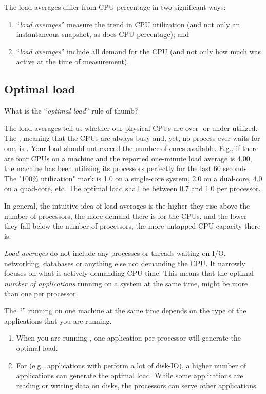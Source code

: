 The load averages differ from CPU percentage in two significant ways:

\begin{enumerate}
\item  ``\emph{load averages}'' measure the trend in CPU utilization (and not only an instantaneous snapshot, as does CPU percentage); and
\item  ``\emph{load averages}'' include all demand for the CPU (and not only how much was active at the time of measurement).
\end{enumerate}

\subsection{Optimal load}

What is the ``\emph{optimal load}'' rule of thumb?

The load averages tell us whether our physical CPUs are over- or
under-utilized. The , meaning that the
CPUs are always busy and, yet, no process ever waits for one, is .  Your load should not exceed the number
of cores available.  E.g., if there are four CPUs on a machine and the reported
one-minute load average is 4.00, the machine has been utilizing its processors
perfectly for the last 60 seconds. The "100\% utilization" mark is 1.0 on a
single-core system, 2.0 on a dual-core, 4.0 on a quad-core, etc. The optimal
load shall be between 0.7 and 1.0 per processor.

In general, the intuitive idea of load averages is the higher they rise above
the number of processors, the more demand there is for the CPUs, and the lower
they fall below the number of processors, the more untapped CPU capacity there
is.

\emph{Load averages} do not include any processes or threads waiting on I/O,
networking, databases or anything else not demanding the CPU. It narrowly
focuses on what is actively demanding CPU time. This means that the optimal
\emph{number of applications} running on a system at the same time, might be
more than one per processor.

The ``'' running on one machine at the
same time depends on the type of the applications that you are running.

\begin{enumerate}
\item  When you are running , one
  application per processor will generate the optimal load.
\item  For  (e.g., applications with perform
  a lot of disk-IO), a higher number of applications can generate the optimal
  load. While some applications are reading or writing data on disks, the
  processors can serve other applications.
\end{enumerate}

